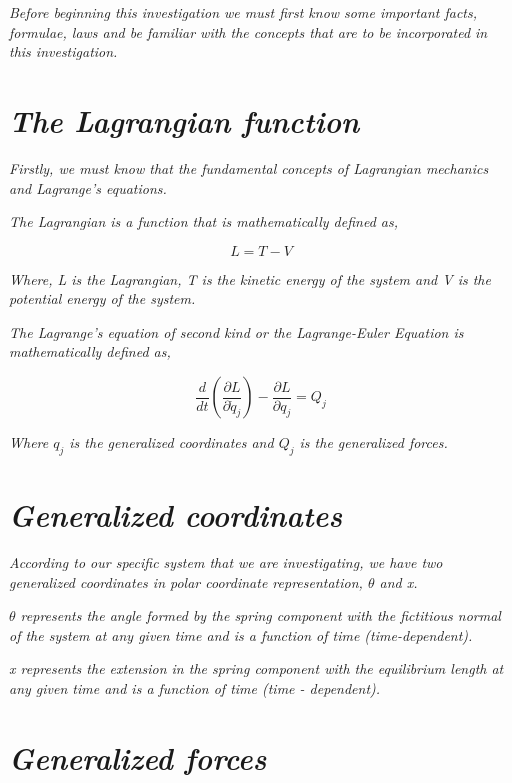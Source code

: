 \textit{Before beginning this investigation we must first know some important facts, formulae, laws and be familiar with the concepts that are to be incorporated in this investigation.}

\section{\textit{The Lagrangian function}}
        
    \textit{Firstly, we must know that the fundamental concepts of Lagrangian mechanics and Lagrange's equations.}
        
    \textit{The Lagrangian is a function that is mathematically defined as,}
        
    $$L = T - V$$
        
    \textit{Where, L is the Lagrangian, T is the kinetic energy of the system and V is the potential energy of the system.}
        
    \textit{The Lagrange's equation of second kind or the Lagrange-Euler Equation is mathematically defined as,}
        
    $$\frac{d}{dt}\left(\frac{\partial L}{\partial \dot{q}_j}\right) - \frac{\partial L}{\partial q_j} = Q_j$$
        
    \textit{Where $q_j$ is the generalized coordinates and $Q_j$ is the generalized forces.}
      
    \section{\textit{Generalized coordinates}}
        
    \textit{According to our specific system that we are investigating, we have two generalized coordinates in polar coordinate representation, $\theta$ and x.}
        
    \textit{$\theta$ represents the angle formed by the spring component with the fictitious normal of the system at any given time and is a function of time (time-dependent).}
        
    \textit{x represents the extension in the spring component with the equilibrium length at any given time and is a function of time (time - dependent).}
            
    \section{\textit{Generalized forces}}
        

